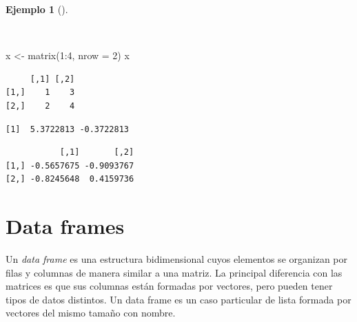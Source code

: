\documentclass[
  spanish,
  a4paper,
]{scrreport}
\newenvironment{Shaded}{\begin{snugshade}}{\end{snugshade}}
\newcommand{\AttributeTok}[1]{\textcolor[rgb]{0.40,0.45,0.13}{#1}}
\newcommand{\CommentTok}[1]{\textcolor[rgb]{0.37,0.37,0.37}{#1}}
\newcommand{\DecValTok}[1]{\textcolor[rgb]{0.68,0.00,0.00}{#1}}
\newcommand{\FunctionTok}[1]{\textcolor[rgb]{0.28,0.35,0.67}{#1}}
\newcommand{\NormalTok}[1]{\textcolor[rgb]{0.00,0.23,0.31}{#1}}
\newcommand{\OtherTok}[1]{\textcolor[rgb]{0.00,0.23,0.31}{#1}}
\newcommand{\SpecialCharTok}[1]{\textcolor[rgb]{0.37,0.37,0.37}{#1}}
\theoremstyle{definition}
\theoremstyle{definition}
\newtheorem{example}{Ejemplo}[chapter]
\theoremstyle{remark}
\begin{document}
\begin{example}[]\protect\hypertarget{exm-autovalores-autovectores}{}\label{exm-autovalores-autovectores}

~

\begin{Shaded}
\begin{Highlighting}[]
\NormalTok{x }\OtherTok{\textless{}{-}} \FunctionTok{matrix}\NormalTok{(}\DecValTok{1}\SpecialCharTok{:}\DecValTok{4}\NormalTok{, }\AttributeTok{nrow =} \DecValTok{2}\NormalTok{)}
\NormalTok{x}
\end{Highlighting}
\end{Shaded}

\begin{verbatim}
     [,1] [,2]
[1,]    1    3
[2,]    2    4
\end{verbatim}

\begin{Shaded}
\end{Shaded}

\begin{verbatim}
[1]  5.3722813 -0.3722813
\end{verbatim}

\begin{Shaded}
\end{Shaded}

\begin{verbatim}
           [,1]       [,2]
[1,] -0.5657675 -0.9093767
[2,] -0.8245648  0.4159736
\end{verbatim}

\end{example}

\section{Data frames}\label{data-frames}

Un \emph{data frame} es una estructura bidimensional cuyos elementos se
organizan por filas y columnas de manera similar a una matriz. La
principal diferencia con las matrices es que sus columnas están formadas
por vectores, pero pueden tener tipos de datos distintos. Un data frame
es un caso particular de lista formada por vectores del mismo tamaño con
nombre.
\end{document}
